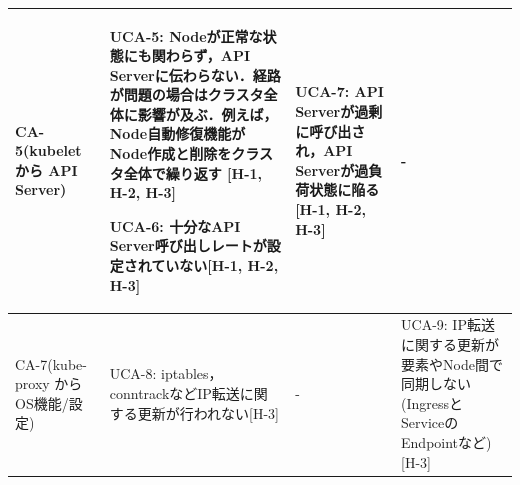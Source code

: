 \documentclass[12pt,a4j]{ujreport}
\begin{document}
\begin{footnotesize}
\begin{tabularx}{\linewidth}{
            >{\hsize=0.7\hsize}X|
            >{\hsize=1.1\hsize}X|
            >{\hsize=1.1\hsize}X|
            >{\hsize=1.1\hsize}X
        }
        CA-5(kubelet から API Server)                                 & UCA-5: Nodeが正常な状態にも関わらず，API Serverに伝わらない．経路が問題の場合はクラスタ全体に影響が及ぶ．例えば，Node自動修復機能がNode作成と削除をクラスタ全体で繰り返す [H-1, H-2, H-3] \par\noindent                                                                                                                                                                                                                             UCA-6: 十分なAPI Server呼び出しレートが設定されていない[H-1, H-2, H-3] & UCA-7: API Serverが過剰に呼び出され，API Serverが過負荷状態に陥る[H-1, H-2, H-3]                                                                                                                                                                                                                                                & -                                                                                                                                    \\ \hline
        CA-7(kube-proxy から OS機能/設定)                             & UCA-8: iptables，conntrackなどIP転送に関する更新が行われない[H-3]                                                                                                                                                                                                                                                                                                                                                                                                                                          & -                                                                                                                                                                                                                                                                                                                               & UCA-9: IP転送に関する更新が要素やNode間で同期しない(IngressとServiceのEndpointなど)[H-3]                                   \\ \hline

\end{tabularx}
\end{footnotesize}
\end{document}
